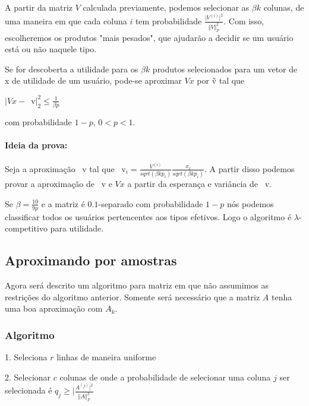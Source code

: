 \documentclass[a4paper,10pt]{article}
\begin{document}
A partir da matriz $V$ calculada previamente, podemos selecionar as $\beta k$ colunas, de uma maneira em que cada  
coluna $i$ tem probabilidade $\frac{\vert V^{(i)} \vert^2}{\Vert V \Vert^2_F}$. Com 
isso, escolheremos os produtos "mais pesados", que ajudarão a decidir se um usuário está ou não naquele tipo.

\begin{lema}
Se for descoberta a utilidade para os $\beta k$ produtos selecionados para um vetor
de x de utilidade de um usuário, pode-se aproximar $V x$ por \~v tal que 

$\vert V x  - $~v$ \vert^2_2 \leq \frac{1}{\beta p}$

com probabilidade $1 - p$, $0 < p < 1$.
\end{lema}

\paragraph{Ideia da prova:}

Seja a aproximação ~v tal que ~v$_i = \frac {V^{(i)}}{sqrt(\beta k p_i)} \frac{x_i}{sqrt(\beta k p_i)}$.
 A partir disso podemos provar a aproximação de ~v e $Vx$ a partir da esperança e variância de ~v.


\begin{coro}
Se $\beta = \frac{10}{9p}$ e a matriz é $0.1$-separado com probabilidade $1 - p$
nós podemos classificar todos os usuários pertencentes aos tipos efetivos. Logo o 
algoritmo é $\lambda$-competitivo  para utilidade.
\end{coro}

\subsection{Aproximando por amostras}

Agora será descrito um algoritmo para matriz em que não assumimos as restrições
do algoritmo anterior. Somente será necessário que a matriz $A$ tenha uma boa 
aproximação com $A_k$.

\subsubsection{Algoritmo}

1. Seleciona $r$ linhas de maneira uniforme

2. Selecionar $c$ colunas de onde a probabilidade de selecionar uma coluna $j$ ser selecionada 
é  $q_j \geq \vert \frac{A^{(j)} \vert^2}{\Vert A \Vert^2_F}$
\end{document}

